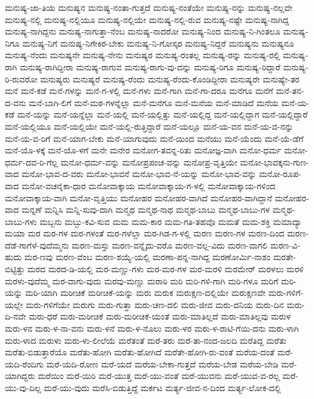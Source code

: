 ಮನುಷ್ಯ-ಜಾ-ತಿಯ
ಮನುಷ್ಯನ
ಮನುಷ್ಯ-ನಂತಾ-ಗುತ್ತದೆ
ಮನುಷ್ಯ-ನಂತೆಯೇ
ಮನುಷ್ಯ-ನನ್ನು
ಮನುಷ್ಯ-ನಲ್ಲವೇ
ಮನುಷ್ಯ-ನಲ್ಲಿ
ಮನುಷ್ಯ-ನಲ್ಲಿಯೂ
ಮನುಷ್ಯ-ನಲ್ಲಿಯೇ
ಮನುಷ್ಯ-ನಲ್ಲಿ-ರುವ
ಮನುಷ್ಯ-ನಷ್ಟೇ
ಮನುಷ್ಯ-ನಾಗಿದ್ದ
ಮನುಷ್ಯ-ನಾಗಿದ್ದನು
ಮನುಷ್ಯ-ನಾಗುತ್ತಾ-ನೆಂಬ
ಮನುಷ್ಯ-ನಾದರೋ
ಮನುಷ್ಯ-ನಿಂದ
ಮನುಷ್ಯ-ನಿ-ಗಿಂತಲೂ
ಮನುಷ್ಯ-ನಿಗೂ
ಮನುಷ್ಯ-ನಿಗೆ
ಮನುಷ್ಯ-ನಿಗೇಕಿರ-ಬೇಕು
ಮನುಷ್ಯ-ನಿ-ಗೋಸ್ಕರ
ಮನುಷ್ಯ-ನಿದ್ದರೆ
ಮನುಷ್ಯನು
ಮನುಷ್ಯನೂ
ಮನುಷ್ಯ-ನೆಂದು
ಮನುಷ್ಯನೇ
ಮನುಷ್ಯ-ನೇನು
ಮನುಷ್ಯರ
ಮನುಷ್ಯ-ರಂತಲ್ಲ
ಮನುಷ್ಯ-ರನ್ನು
ಮನುಷ್ಯ-ರಲ್ಲಿ
ಮನುಷ್ಯ-ರಾಗಿ
ಮನುಷ್ಯ-ರಾಗಿದ್ದೀರಾ
ಮನುಷ್ಯ-ರಾಗುವ
ಮನುಷ್ಯ-ರಾಗು-ವು-ದನ್ನು
ಮನುಷ್ಯ-ರಿಗೂ
ಮನುಷ್ಯ-ರಿದ್ದಾರೆ
ಮನುಷ್ಯ-ರಿ-ರುವರೋ
ಮನುಷ್ಯರು
ಮನುಷ್ಯರೆ
ಮನುಷ್ಯ-ರೆಂದು
ಮನುಷ್ಯ-ರೆಂದು-ಕೊಂಡಿದ್ದೀರಾ
ಮನುಷ್ಯರೇ
ಮನುಷ್ಯೇ-ತರ
ಮನೆ
ಮನೆ-ಕಡೆ
ಮನೆ-ಗಳನ್ನು
ಮನೆ-ಗ-ಳಲ್ಲಿ
ಮನೆ-ಗಳು
ಮನೆ-ಗಾಗಿ
ಮನೆ-ಗಾ-ದರೂ
ಮನೆಗೂ
ಮನೆಗೆ
ಮನೆ-ತನ-ದ-ವನು
ಮನೆ-ಬಾಗಿ-ಲಿಗೆ
ಮನೆ-ಮಠ-ಗಳನ್ನೆಲ್ಲಾ
ಮನೆ-ಮನೆಗೂ
ಮನೆ-ಮನೆಯ
ಮನೆ-ಮಾಡಿದೆ
ಮನೆಯ
ಮನೆ-ಯ-ಕಡೆ
ಮನೆ-ಯನ್ನು
ಮನೆ-ಯನ್ನೆಲ್ಲಾ
ಮನೆ-ಯಲ್ಲಿ
ಮನೆ-ಯಲ್ಲಿತ್ತು
ಮನೆ-ಯಲ್ಲಿದ್ದ
ಮನೆ-ಯಲ್ಲಿದ್ದಾಗ
ಮನೆ-ಯಲ್ಲಿದ್ದಾರೆ
ಮನೆ-ಯಲ್ಲಿಯೂ
ಮನೆ-ಯಲ್ಲಿಯೇ
ಮನೆ-ಯಲ್ಲಿ-ರುತ್ತಿದ್ದಾರೆ
ಮನೆ-ಯಲ್ಲೂ
ಮನೆ-ಯ-ವನ
ಮನೆ-ಯ-ವ-ನನ್ನು
ಮನೆ-ಯ-ವ-ರಿಗೆ
ಮನೆ-ಯಾಗ-ಬೇಕು
ಮನೆ-ಯಾಗುವುದು
ಮನೆ-ಯಿಂದ
ಮನೆಯು
ಮನೆ-ಯೆಂದು
ಮನೆ-ಯೆ-ಡೆಗೆ
ಮನೆ-ಯೊ-ಳಕ್ಕೆ
ಮನೆ-ಯೊ-ಳಗೆ
ಮನೇ
ಮನೇರ
ಮನೋಗ-ತವನ್ನ-ರಿತು
ಮನೋಜ್ಞ-ವಾಗಿ
ಮನೋ-ಧರ್ಮ
ಮನೋ-ಧರ್ಮ-ದವ-ರಿ-ಗೆಲ್ಲ
ಮನೋ-ಧರ್ಮ-ವನ್ನು
ಮನೋಪ್ರಪಂಚ-ವನ್ನು
ಮನೋಪ್ರ-ವೃತ್ತಿಯೇ
ಮನೋ-ಭಾವಕ್ಕನು-ಗುಣ-ವಾದ
ಮನೋ-ಭಾವ-ದ-ವರು
ಮನೋ-ಭಾವನೆ
ಮನೋ-ಭಾವ-ನೆ-ಯನ್ನು
ಮನೋ-ಭಾವ-ವನ್ನು
ಮನೋ-ರೂಪ-ವಾದ
ಮನೋ-ವಚನೈಕಾ-ಧಾರ
ಮನೋವಾಕ್ಕಾಯ
ಮನೋವಾಕ್ಕಾಯ-ಗ-ಳಲ್ಲಿ
ಮನೋವಾಕ್ಕಾಯ-ಗಳಿಂದ
ಮನೋವಾಕ್ಕಾಯ-ವಾಗಿ
ಮನೋ-ವೃತ್ತಿಯು
ಮನೋಹರ
ಮನೋಹರ-ವಾಗಿದೆ
ಮನೋಹರ-ವಾಗಿದ್ದಾನೆ
ಮನೋಹರ-ವಾದ
ಮನ್ನಣೆ
ಮನ್ನಿಸಿ
ಮನ್ನಿ-ಸುವು-ದಾಗಿ
ಮನ್ಮಥ
ಮನ್ಮಥ-ನಾಥ
ಮನ್ಮಥ-ಬಾಬು
ಮನ್ಮಥ-ಬಾಬು-ಗಳ
ಮನ್ಮಥ-ಬಾಬು-ಗಳು
ಮಬ್ಬನು
ಮಬ್ಬು-ಕವಿ-ಸುವ
ಮಮ
ಮಮ-ಕಾರ
ಮಮ-ಗತಿ-ತಹವೊ
ಮಮತೆ
ಮಮ-ಶಕ್ತಿ
ಮಮಾದ್ಯಾ
ಮಯಾ
ಮರ
ಮರ-ಗಳ
ಮರ-ಗಳಂತೆ
ಮರ-ಗಳೆಲ್ಲಾ
ಮರ-ಗಿಡ-ಗ-ಳಲ್ಲಿ
ಮರಣ
ಮರಣ-ಗಳ
ಮರಣ-ದಿಂದ
ಮರಣ-ದೆಡೆ-ಗಾಗೆಳೆ-ವುದೆಮ್ಮನು
ಮರಣ-ಮಸ್ತು
ಮರಣ-ವನ್ನೈದು-ವರೊ
ಮರಣ-ವಲ್ಲ-ವಿದು
ಮರಣ-ವಾಗಲಿ
ಮರಣ-ವಿ-ಹುದು
ಮರ-ಣವು
ಮರಣ-ವೆಂಬ
ಮರಣ-ಶಯ್ಯೆ-ಯಲ್ಲಿ
ಮರಣಾ-ಪನ್ನ-ನಾಗಿದ್ದ
ಮರಣೋರ್ಮಿ-ನಾಶಂ
ಮರತೇ-ಬಿಟ್ಟಿತ್ತು
ಮರದ
ಮರದ-ಡಿ-ಯಲ್ಲಿ
ಮರ-ಮಣ್ಣು-ಗಳು
ಮರ-ಮರ-ಗಳ
ಮರ-ಮರಳಿ
ಮರಮೇರ್
ಮರಳಲು
ಮರಳಿ
ಮರಳು-ವುದೆಮ್ಮ
ಮರ-ವಾಗು-ವುದು
ಮರವು-ಮಣ್ಣು
ಮರಾಠಿ
ಮರಿ
ಮರಿ-ಗಳಿ-ಗಾಗಿ
ಮರಿ-ಗಳೂ
ಮರಿಗೆ
ಮರಿ-ಯನ್ನು
ಮರಿ-ಯಾಗಿ
ಮರೀಚಿಕೆ
ಮರೀಚಿಕೆ-ಯನ್ನು
ಮರು
ಮರುಕ
ಮರುಕ್ಷಣ-ದಲ್ಲಿಯೇ
ಮರುಕ್ಷಣವೇ
ಮರು-ಗಳಿಗೆ-ಯಲ್ಲೇ
ಮರು-ಗಳಿಗೆಯೇ
ಮರುಗು
ಮರು-ಗುತ್ತಾ
ಮರು-ಚಣ-ದಲಿ
ಮರು-ಜೀವ
ಮರು-ದನಿಯ
ಮರು-ದಿನ
ಮರು-ದಿ-ನವೇ
ಮರು-ಧರೆ
ಮರು-ಮರೀಚಿಕೆ
ಮರು-ಮರೀಚಿಕೆ-ಯಂತೆ
ಮರು-ಮಾತಿಲ್ಲದೆ
ಮರು-ಮಾತಿಲ್ಲವು
ಮರುಳ
ಮರು-ಳನ
ಮರು-ಳ-ನಾ-ವನು
ಮರು-ಳನೆ
ಮರು-ಳ-ನೊಲು
ಮರು-ಳರ
ಮರು-ಳ-ರಾಟಿ-ಗೆಯಿ-ದನು
ಮರು-ಳಾಗಿ
ಮರು-ಳಾದ
ಮರುಳು
ಮರು-ಳು-ಲೀಲೆಯೆ
ಮರೆತಂತೆ
ಮರೆ-ತರು
ಮರೆ-ತಾ-ನಂದ-ಜಲದಿ
ಮರೆತಿದ್ದ
ಮರೆತು
ಮರೆತು-ಬಿಡುತ್ತಾರೆಯೊ
ಮರೆತು-ಹೋಗಿ
ಮರೆತು-ಹೋಗಿದೆ
ಮರೆತೇ-ಹೋಗಿ-ರು-ವಂತೆ
ಮರೆಯ-ದಂತೆ
ಮರೆ-ಯದಿ-ರೆಂದಿಗು
ಮರೆ-ಯದಿ-ರೋಣ
ಮರೆ-ಯದೆ
ಮರೆಯ-ಬೇಕಾ-ಗುತ್ತದೆ
ಮರೆಯ-ಬೇಡ
ಮರೆಯ-ಬೇಡಿ
ಮರೆ-ಯಾಗಿದ್ದರು
ಮರೆಯಿಂ
ಮರೆ-ಯಿರಿ
ಮರೆ-ಯುತ್ತ
ಮರೆ-ಯು-ವಂತೆ
ಮರೆ-ಯುವನು
ಮರೆ-ಯುವ-ವ-ರಲ್ಲ
ಮರೆ-ಯು-ವು-ದಿಲ್ಲ
ಮರೆ-ಯು-ವುದು
ಮರೆಸಿ-ಬಿಡುತ್ತಿದ್ದೆ
ಮರ್ಕಟ
ಮರ್ತ್ಯ-ಜೀವ-ನ-ದಿಂದ
ಮರ್ತ್ಯ-ಲೋಕ-ದಲ್ಲಿ
